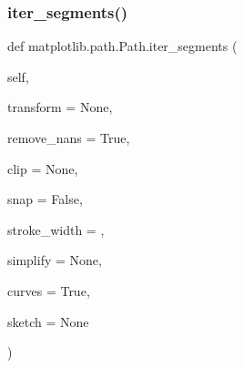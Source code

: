\subsubsection{\texorpdfstring{iter\+\_\+segments()}{iter\_segments()}}
{\footnotesize\ttfamily def matplotlib.\+path.\+Path.\+iter\+\_\+segments (\begin{DoxyParamCaption}\item[{}]{self,  }\item[{}]{transform = {\ttfamily None},  }\item[{}]{remove\+\_\+nans = {\ttfamily True},  }\item[{}]{clip = {\ttfamily None},  }\item[{}]{snap = {\ttfamily False},  }\item[{}]{stroke\+\_\+width = {},  }\item[{}]{simplify = {\ttfamily None},  }\item[{}]{curves = {\ttfamily True},  }\item[{}]{sketch = {\ttfamily None} }\end{DoxyParamCaption})}

